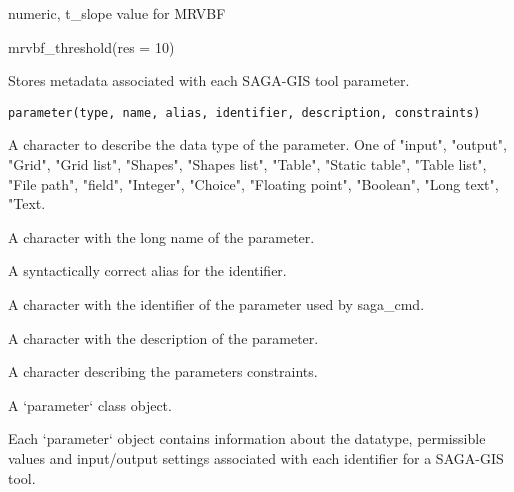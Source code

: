 \documentclass[a4paper]{book}
\begin{document}
%
\begin{Value}
numeric, t\_slope value for MRVBF
\end{Value}
%
\begin{Examples}
\begin{ExampleCode}
mrvbf_threshold(res = 10)
\end{ExampleCode}
\end{Examples}
%
\begin{Description}
Stores metadata associated with each SAGA-GIS tool parameter.
\end{Description}
%
\begin{Usage}
\begin{verbatim}
parameter(type, name, alias, identifier, description, constraints)
\end{verbatim}
\end{Usage}
%
\begin{Arguments}
\begin{ldescription}
\item[\code{type}] A character to describe the data type of the parameter. One of
"input", "output", "Grid", "Grid list", "Shapes", "Shapes list", "Table",
"Static table", "Table list", "File path", "field", "Integer", "Choice",
"Floating point", "Boolean", "Long text", "Text.

\item[\code{name}] A character with the long name of the parameter.

\item[\code{alias}] A syntactically correct alias for the identifier.

\item[\code{identifier}] A character with the identifier of the parameter used by
saga\_cmd.

\item[\code{description}] A character with the description of the parameter.

\item[\code{constraints}] A character describing the parameters constraints.
\end{ldescription}
\end{Arguments}
%
\begin{Value}
A `parameter` class object.
\end{Value}
%
\begin{Description}
Each `parameter` object contains information about the datatype, permissible
values and input/output settings associated with each identifier for a
SAGA-GIS tool.
\end{Description}
\end{document}
